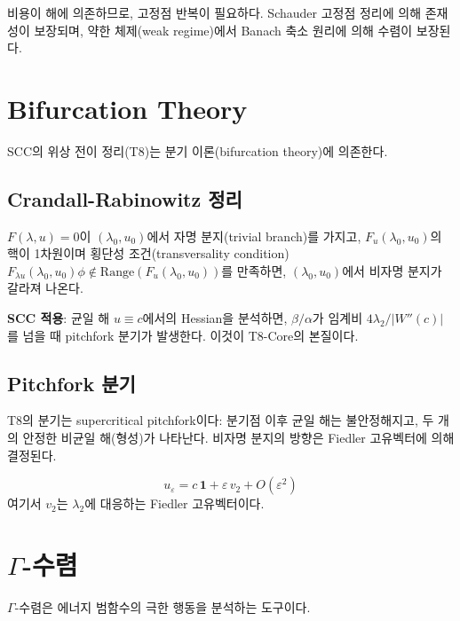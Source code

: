 비용이 해에 의존하므로, 고정점 반복이 필요하다. Schauder 고정점 정리에 의해 존재성이 보장되며, 약한 체제(weak regime)에서 Banach 축소 원리에 의해 수렴이 보장된다.


\section{Bifurcation Theory}
\label{app:bifurcation}

SCC의 위상 전이 정리(T8)는 분기 이론(bifurcation theory)에 의존한다.


\subsection{Crandall-Rabinowitz 정리}

\begin{theorem}
$F(\lambda, u) = 0$이 $(\lambda_0, u_0)$에서 자명 분지(trivial branch)를 가지고, $F_u(\lambda_0, u_0)$의 핵이 1차원이며 횡단성 조건(transversality condition) $F_{\lambda u}(\lambda_0, u_0) \phi \notin \mathrm{Range}(F_u(\lambda_0, u_0))$를 만족하면, $(\lambda_0, u_0)$에서 비자명 분지가 갈라져 나온다.
\end{theorem}

\textbf{SCC 적용}: 균일 해 $u \equiv c$에서의 Hessian을 분석하면, $\beta/\alpha$가 임계비 $4\lambda_2/|W''(c)|$를 넘을 때 pitchfork 분기가 발생한다. 이것이 T8-Core의 본질이다.


\subsection{Pitchfork 분기}

T8의 분기는 supercritical pitchfork이다: 분기점 이후 균일 해는 불안정해지고, 두 개의 안정한 비균일 해(형성)가 나타난다. 비자명 분지의 방향은 Fiedler 고유벡터에 의해 결정된다.

\begin{equation}
    u_\varepsilon = c\,\mathbf{1} + \varepsilon\, v_2 + O(\varepsilon^2)
    \label{eq:pitchfork-branch}
\end{equation}
여기서 $v_2$는 $\lambda_2$에 대응하는 Fiedler 고유벡터이다.


\section{$\Gamma$-수렴}
\label{app:gamma-convergence}

$\Gamma$-수렴은 에너지 범함수의 극한 행동을 분석하는 도구이다.

